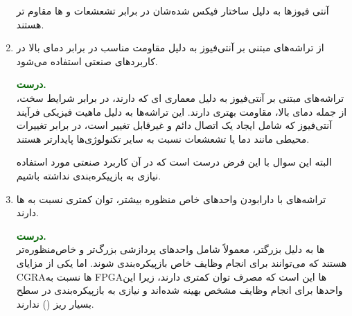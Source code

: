 \begin{enumerate}
\begin{qsolve}
		
		
		
	\end{qsolve}
	
	\begin{qsolve}
		آنتی فیوز‌ها به دلیل ساختار فیکس شده‌شان در برابر تشعشعات و  ها مقاوم تر هستند.
	\end{qsolve}
	
	
	
	
	\item 
	از تراشه‌های مبتنی بر آنتی‌فیوز به دلیل مقاومت مناسب در برابر دمای بالا در کاربردهای صنعتی استفاده می‌شود.
	\begin{qsolve}
		\textbf{\textcolor{darkgreen}{درست.}}\\
		تراشه‌های مبتنی بر آنتی‌فیوز به دلیل معماری ای که دارند، در برابر شرایط سخت، از جمله دمای بالا، مقاومت بهتری دارند. این تراشه‌ها به دلیل ماهیت فیزیکی فرآیند آنتی‌فیوز که شامل ایجاد یک اتصال دائم و غیرقابل تغییر است، در برابر تغییرات محیطی مانند دما یا تشعشعات نسبت به سایر تکنولوژی‌ها پایدارتر هستند.
		
		البته این سوال با این فرض درست است که در آن کاربرد صنعتی مورد استفاده نیازی به بازپیکره‌بندی نداشته باشیم.
	\end{qsolve}
	
	
	
	
	\item 
	تراشه‌های  با دارابودن واحدهای خاص منظوره بیشتر، توان کمتری نسبت به ها دارند.
	\begin{qsolve}
		\textbf{\textcolor{darkgreen}{درست.}}\\
		 ها
		به دلیل  ‌بزرگتر، معمولاً شامل واحدهای پردازشی بزرگ‌تر و خاص‌منظوره‌تر هستند که می‌توانند برای انجام وظایف خاص بازپیکره‌بندی شوند. اما یکی از مزایای CGRAها نسبت به FPGAها این است که مصرف توان کمتری دارند، زیرا این واحدها برای انجام وظایف مشخص بهینه شده‌اند و نیازی به بازپیکره‌بندی در سطح بسیار ریز () ندارند.
		

\end{qsolve}
\end{enumerate}
